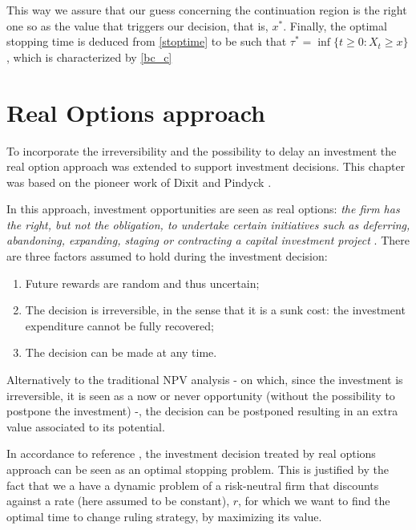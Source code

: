 This way we assure that our guess concerning the continuation region is the right one so as the value that triggers our decision, that is, $x^*$. Finally, the optimal stopping time is deduced from \eqref{stoptime} to be such that $\tau^*= \inf \{ t \geq 0: X_t \geq x \}$, which is characterized by \eqref{bc_c}




\section{Real Options approach}
\label{bc_ro}


To incorporate the irreversibility and the possibility to delay an investment the real option approach was extended to support investment decisions. This chapter was based on the pioneer work of Dixit and Pindyck \cite{dixit:book}.

In this approach, investment opportunities are seen as real options: \textit{the firm has the right, but not the obligation, to undertake certain initiatives such as deferring, abandoning, expanding, staging or contracting a capital investment project} \cite{corp:book}. There are three factors assumed to hold during the investment decision:
\begin{enumerate}
	\item Future rewards are random and thus uncertain;
	\item The decision is irreversible, in the sense that it is a sunk cost: the investment expenditure cannot be fully recovered;
	\item The decision can be made at any time.
\end{enumerate}


Alternatively to the traditional NPV analysis - on which, since the investment is irreversible, it is seen as a now or never opportunity (without the possibility to postpone the investment) -, the decision can be postponed resulting in an extra value associated to its potential. 

In accordance to reference \cite{dixit:book}, the investment decision treated by real options approach can be seen as an optimal stopping problem. This is justified by the fact that we a have a dynamic problem of a risk-neutral firm that discounts against a rate (here assumed to be constant), $r$, for which we want to find the optimal time to change ruling strategy, by maximizing its value.


